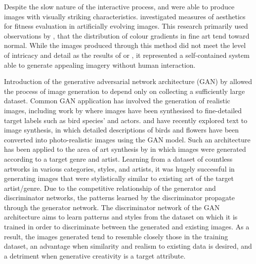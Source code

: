 \documentclass{article}
\begin{document}
Despite the slow nature of the interactive process, \citet{sims} and \citet{nevar} were able to produce images with visually striking characteristics.
\citet{aesthetic-measures} investigated measures of aesthetics for fitness evaluation in artificially evolving images.
This research primarily used observations by \citet{ralph-bell-curve}, that the distribution of colour gradients in fine art tend toward normal.
While the images produced through this method did not meet the level of intricacy and detail as the results of \citet{sims} or \citet{nevar}, it represented a self-contained system able to generate appealing imagery without human interaction.

Introduction of the generative adversarial network architecture (GAN) by \citet{GAN} allowed the process of image generation to depend only on collecting a sufficiently large dataset.
Common GAN application has involved the generation of realistic images, including work by \citet{bao2017cvae} where images have been synthesised to fine-detailed target labels such as bird species' and actors.
\citet{zhang2017stackgan} and \citet{reed2016generative} have recently explored text to image synthesis, in which detailed descriptions of birds and flowers have been converted into photo-realistic images using the GAN model.
Such an architecture has been applied to the area of art synthesis by \citet{tan2017artgan} in which images were generated according to a target genre and artist.
Learning from a dataset of countless artworks in various categories, styles, and artists, it was hugely successful in generating images that were stylistically similar to existing art of the target artist/genre.
Due to the competitive relationship of the generator and discriminator networks, the patterns learned by the discriminator propagate through the generator network.
The discriminator network of the GAN architecture aims to learn patterns and styles from the dataset on which it is trained in order to discriminate between the generated and existing images.
As a result, the images generated tend to resemble closely those in the training dataset, an advantage when similarity and realism to existing data is desired, and a detriment when generative creativity is a target attribute.
\end{document}
